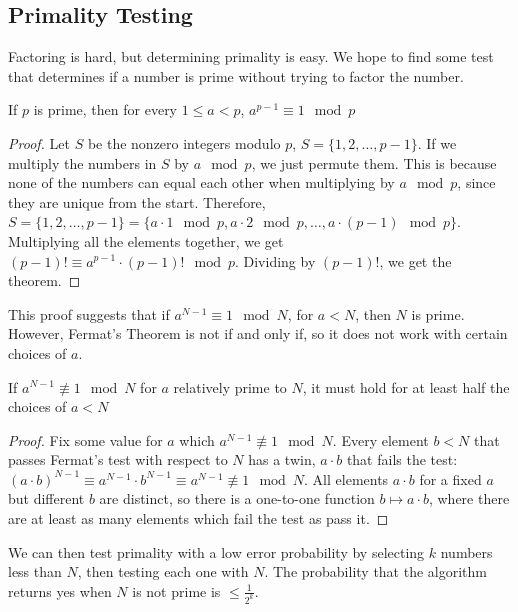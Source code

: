 \subsection{Primality Testing}
Factoring is hard, but determining primality is easy.
We hope to find some test that determines if a number is prime without trying to factor the number.
\begin{thm}
  If $p$ is prime, then for every $1 \leq a < p$, $a^{p-1} \equiv 1 \mod p$
\end{thm}
\begin{proof}
  Let $S$ be the nonzero integers modulo $p$, $S = \{1, 2, \dots, p-1\}$.
  If we multiply the numbers in $S$ by $a \mod p$, we just permute them.
  This is because none of the numbers can equal each other when multiplying by $a \mod p$, since they are unique from the start.
  Therefore, $S = \{1, 2, \dots, p-1\} = \{a \cdot 1 \mod p, a \cdot 2 \mod p, \dots, a \cdot (p - 1) \mod p\}$.
  Multiplying all the elements together, we get $(p-1)! \equiv a^{p-1} \cdot (p-1)! \mod p$.
  Dividing by $(p-1)!$, we get the theorem.
\end{proof}
This proof suggests that if $a^{N-1} \equiv 1 \mod N$, for $a < N$, then $N$ is prime.
However, Fermat's Theorem is not if and only if, so it does not work with certain choices of $a$.

\begin{lemma}
  If $a^{N-1} \not\equiv 1 \mod N$ for $a$ relatively prime to $N$, it must hold for at least half the choices of $a < N$
\end{lemma}
\begin{proof}
  Fix some value for $a$ which $a^{N-1} \not \equiv 1 \mod N$.
  Every element $b < N$ that passes Fermat's test with respect to $N$ has a twin, $a \cdot b$ that fails the test: $(a \cdot b) ^ {N-1} \equiv a^{N-1} \cdot b^{N-1} \equiv a^{N-1} \not \equiv 1 \mod N$.
  All elements $a \cdot b$ for a fixed $a$ but different $b$ are distinct, so there is a one-to-one function $b \mapsto a \cdot b$, where there are at least as many elements which fail the test as pass it.
\end{proof}
We can then test primality with a low error probability by selecting $k$ numbers less than $N$, then testing each one with $N$.
The probability that the algorithm returns yes when $N$ is not prime is $\leq \frac{1}{2^k}$.

